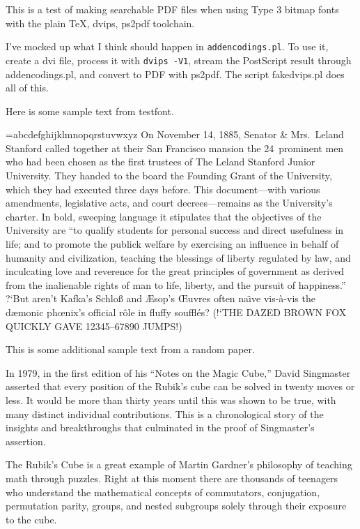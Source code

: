 This is a test of making searchable PDF files when using Type 3 bitmap
fonts with the plain \TeX, dvips, ps2pdf toolchain.

I've mocked up what I think should happen in {\tt addencodings.pl}.
To use it, create a dvi file, process it with {\tt dvips -V1}, stream
the PostScript result through addencodings.pl, and convert to PDF with
ps2pdf.  The script fakedvips.pl does all of this.

Here is some sample text from testfont.

\def\text{{\advance\baselineskip-4pt
\setbox0=\hbox{abcdefghijklmnopqrstuvwxyz}
\ifdim\hsize>2\wd0 \ifdim 15pc>2\wd0 \hsize=15pc \else \hsize=2\wd0 \fi\fi
On November 14, 1885, Senator \& Mrs.~Leland Stanford called
together at their San Francisco mansion the 24~prominent men who had
been chosen as the first trustees of The Leland Stanford Junior University.
They handed to the board the Founding Grant of the University, which they
had executed three days before. This document---with various amendments,
legislative acts, and court decrees---remains as the University's charter.
In bold, sweeping language it stipulates that the objectives of the University
are ``to qualify students for personal success and direct usefulness in life;
and to promote the publick welfare by exercising an influence in behalf of
humanity and civilization, teaching the blessings of liberty regulated by
law, and inculcating love and reverence for the great principles of
government as derived from the inalienable rights of man to life, liberty,
and the pursuit of happiness.'' \moretext
(!`THE DAZED BROWN FOX QUICKLY GAVE 12345--67890 JUMPS!)\par}}
\def\moretext{?`But aren't Kafka's Schlo{\ss} and {\AE}sop's {\OE}uvres
often na{\"\i}ve  vis-\`a-vis the d{\ae}monic ph{\oe}nix's official r\^ole
in fluffy souffl\'es? }

\text

This is some additional sample text from a random paper.

In 1979, in the first edition of his ``Notes on the Magic
Cube,''
David Singmaster asserted that every position of the Rubik's cube
can be solved in twenty moves or less.  It would be more than
thirty years until this was shown to be true, with many distinct
individual contributions.  This is a chronological story of the
insights and breakthroughs that culminated in the proof of
Singmaster's assertion.

The Rubik's Cube is a great example of Martin Gardner's philosophy
of teaching math through puzzles.  Right at this moment there are
thousands of teenagers who understand the mathematical concepts of
commutators, conjugation, permutation parity, groups, and nested
subgroups solely through their exposure to the cube.

